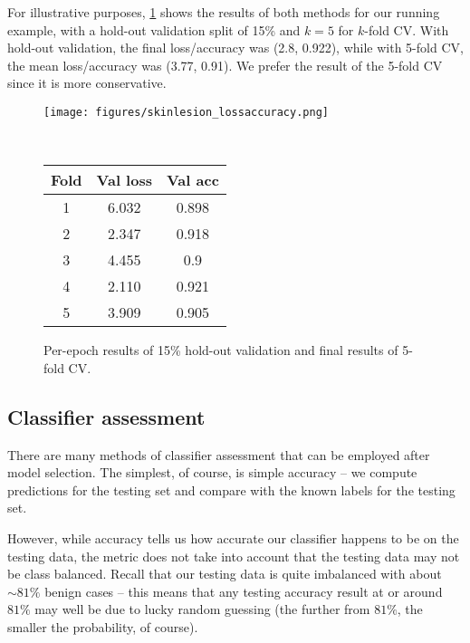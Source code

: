 For illustrative purposes, \cref{fig:skinlesion_plots} shows the results of both
methods for our running example, with a hold-out validation split of 15\% and $k
= 5$ for $k$-fold CV. With hold-out validation, the final loss/accuracy was
(2.8, 0.922), while with 5-fold CV, the mean loss/accuracy was (3.77, 0.91). We
prefer the result of the 5-fold CV since it is more conservative.

\begin{figure}
  \begin{minipage}{0.66\textwidth}
  \texttt{[image: figures/skinlesion\_lossaccuracy.png]}
  \end{minipage}
  ~~~
  \begin{minipage}{0.30\textwidth}
    \vspace{-0.4cm}
\begin{tabular}{|c|c|c|}
  \hline
Fold & Val loss & Val acc\\\hline
1    & 6.032    & 0.898  \\\hline
2    & 2.347    & 0.918  \\\hline
3    & 4.455    & 0.9    \\\hline
4    & 2.110    & 0.921  \\\hline
5    & 3.909    & 0.905  \\\hline
\end{tabular}
  \end{minipage}
  \caption{{\footnotesize Per-epoch results of 15\% hold-out validation and
  final results of 5-fold CV.}}
\label{fig:skinlesion_plots}
\vspace{-0.8cm}
\end{figure}

\subsection{Classifier assessment}

There are many methods of classifier assessment that can be employed after model
selection. The simplest, of course, is simple accuracy -- we compute predictions
for the testing set and compare with the known labels for the testing set.

However, while accuracy tells us how accurate our classifier happens to be on
the testing data, the metric does not take into account that the testing data
may not be class balanced. Recall that our testing data is quite imbalanced with
about $\sim81\%$ benign cases -- this means that any testing accuracy result at
or around $81\%$ may well be due to lucky random guessing (the further from
$81\%$, the smaller the probability, of course).

